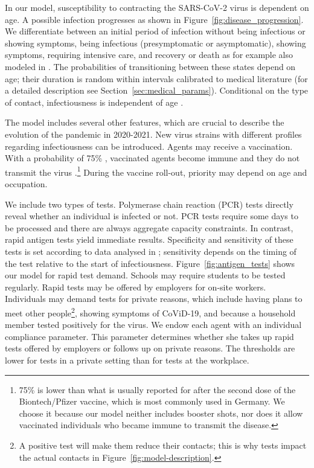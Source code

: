 In our model, susceptibility to contracting the SARS-CoV-2 virus is dependent on age. A
possible infection progresses as shown in Figure~\ref{fig:disease_progression}. We
differentiate between an initial period of infection without being infectious or showing
symptoms, being infectious (presymptomatic or asymptomatic), showing symptoms, requiring
intensive care, and recovery or death as for example also modeled in \cite{Grimm2021}.
The probabilities of transitioning between these states depend on age; their duration is
random within intervals calibrated to medical literature (for a detailed description see
Section~\ref{sec:medical_params}). Conditional on the type of contact, infectiousness is
independent of age \citep{Jones2021}.

The model includes several other features, which are crucial to describe the evolution
of the pandemic in 2020-2021. New virus strains with different profiles regarding
infectiousness can be introduced. Agents may receive a vaccination. With a probability
of 75\% \citep{Hunter2021}, vaccinated agents become immune and they do not transmit the
virus \citep{Petter2021, LevineTiefenbrun2021, Pritchard2021}.\footnote{75\% is lower
    than what is usually reported for after the second dose of the Biontech/Pfizer vaccine,
    which is most commonly used in Germany. We choose it because our model neither includes
    booster shots, nor does it allow vaccinated individuals who became immune to transmit
    the disease\citep{Petter2021, LevineTiefenbrun2021, Pritchard2021}.} During the vaccine
roll-out, priority may depend on age and occupation.

We include two types of tests. Polymerase chain reaction (PCR) tests directly reveal
whether an individual is infected or not. PCR tests require some days to be processed
and there are always aggregate capacity constraints. In contrast, rapid antigen tests
yield immediate results. Specificity and sensitivity of these tests is set according to
data analysed in \cite{Bruemmer2021, Smith2021}; sensitivity depends on the timing of
the test relative to the start of infectiousness. Figure~\ref{fig:antigen_tests} shows
our model for rapid test demand. Schools may require students to be tested regularly.
Rapid tests may be offered by employers for on-site workers. Individuals may demand
tests for private reasons, which include having plans to meet other people\footnote{A
    positive test will make them reduce their contacts; this is why tests impact the actual
    contacts in Figure~\ref{fig:model-description}.}, showing symptoms of CoViD-19, and
because a household member tested positively for the virus. We endow each agent with an
individual compliance parameter. This parameter determines whether she takes up rapid
tests offered by employers or follows up on private reasons. The thresholds are lower for
tests in a private setting than for tests at the workplace.

